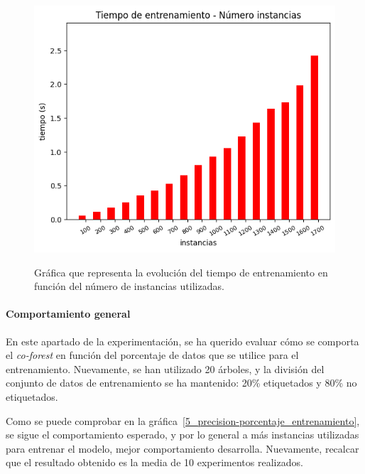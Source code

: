 \begin{figure}[h]
	\caption{Gráfica que representa la evolución del tiempo de entrenamiento en función del número de instancias utilizadas.}
	\centering
	\includegraphics[width=\textwidth]{../img/memoria/5_coforest_tiempo-instancias}
	\label{5_coforest_tiempo-instancias}
\end{figure}
\par


\paragraph{Comportamiento general}

En este apartado de la experimentación, se ha querido evaluar cómo se comporta el \textit{co-forest} en función del porcentaje de datos que se utilice para el entrenamiento. Nuevamente, se han utilizado 20 árboles, y la división del conjunto de datos de entrenamiento se ha mantenido: 20\% etiquetados y 80\% no etiquetados.

Como se puede comprobar en la gráfica~\ref{5_precision-porcentaje_entrenamiento}, se sigue el comportamiento esperado, y por lo general a más instancias utilizadas para entrenar el modelo, mejor comportamiento desarrolla. Nuevamente, recalcar que el resultado obtenido es la media de 10 experimentos realizados.

